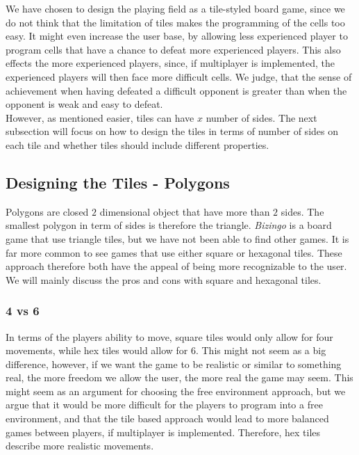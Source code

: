We have chosen to design the playing field as a tile-styled board game, since we do not think that the limitation of tiles makes the programming of the cells too easy. It might even increase the user base, by allowing less experienced player to program cells that have a chance to defeat more experienced players. This also effects the more experienced players, since, if multiplayer is implemented, the experienced players will then face more difficult cells. We judge, that the sense of achievement when having defeated a difficult opponent is greater than when the opponent is weak and easy to defeat.\\

However, as mentioned easier, tiles can have $x$ number of sides. The next subsection will focus on how to design the tiles in terms of number of sides on each tile and whether tiles should include different properties.

\subsection{Designing the Tiles - Polygons}

Polygons are closed $2$ dimensional object that have more than $2$ sides.
The smallest polygon in term of sides is therefore the triangle.
\textit{Bizingo} is a board game that use triangle tiles, but we have not been able to find other games.
It is far more common to see games that use either square or hexagonal tiles.
These approach therefore both have the appeal of being more recognizable to the user.
We will mainly discuss the pros and cons with square and hexagonal tiles.\\

\subsubsection{4 vs 6}

In terms of the players ability to move, square tiles would only allow for four movements, while hex tiles would allow for 6.
This might not seem as a big difference, however, if we want the game to be realistic or similar to something real, the more freedom we allow the user, the more real the game may seem.
This might seem as an argument for choosing the free environment approach, but we argue that it would be more difficult for the players to program into a free environment, and that the tile based approach would lead to more balanced games between players, if multiplayer is implemented.
Therefore, hex tiles describe more realistic movements.\\


